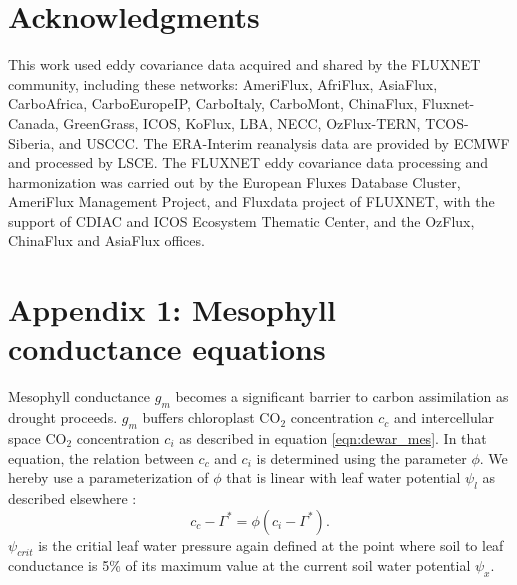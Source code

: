 \documentclass[utf8]{frontiersSCNS} %
\begin{document}
\section*{Acknowledgments}
This work used eddy covariance data acquired and shared by the FLUXNET community, including these networks: AmeriFlux, AfriFlux, AsiaFlux, CarboAfrica, CarboEuropeIP, CarboItaly, CarboMont, ChinaFlux, Fluxnet-Canada, GreenGrass, ICOS, KoFlux, LBA, NECC, OzFlux-TERN, TCOS-Siberia, and USCCC. The ERA-Interim reanalysis data are provided by ECMWF and processed by LSCE. The FLUXNET eddy covariance data processing and harmonization was carried out by the European Fluxes Database Cluster, AmeriFlux Management Project, and Fluxdata project of FLUXNET, with the support of CDIAC and ICOS Ecosystem Thematic Center, and the OzFlux, ChinaFlux and AsiaFlux offices.

\section*{Appendix 1: Mesophyll conductance equations}
Mesophyll conductance $g_m$ becomes a significant barrier to carbon assimilation as drought proceeds. $g_m$ buffers chloroplast CO$_2$ concentration $c_c$ and intercellular space CO$_2$ concentration $c_i$ as described in equation \ref{eqn:dewar_mes}. In that equation, the relation between $c_c$ and $c_i$ is determined using the parameter $\phi$. We hereby use a parameterization of $\phi$ that is linear with leaf water potential $\psi_l$ as described elsewhere \citep{dewar2018new}:
\begin{equation}
    c_c - \Gamma^* = \phi (c_i - \Gamma^*).
\end{equation}
$\psi_{crit}$ is the critial leaf water pressure again defined at the point where soil to leaf conductance is 5\% of its maximum value at the current soil water potential $\psi_x$.
\end{document}
